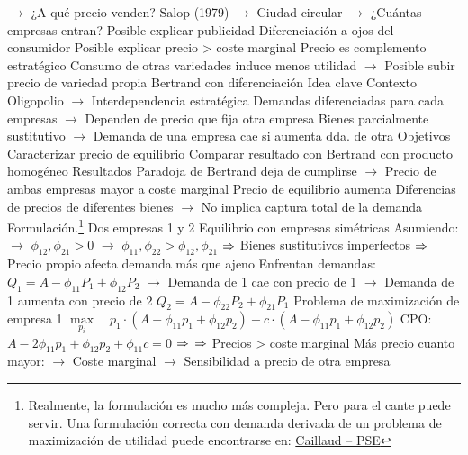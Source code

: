 \documentclass{nuevotema}
\begin{document}
\begin{esquemal}
				\4[] $\to$ ¿A qué precio venden?
				\4[(iii)] Salop (1979)
				\4[] $\to$ Ciudad circular
				\4[] $\to$ ¿Cuántas empresas entran?
				\4 Posible explicar publicidad
				\4[] Diferenciación a ojos del consumidor
				\4 Posible explicar precio > coste marginal
				\4[] Precio es complemento estratégico
				\4[] Consumo de otras variedades induce menos utilidad
				\4[] $\to$ Posible subir precio de variedad propia
		\2 Bertrand con diferenciación
			\3 Idea clave
				\4 Contexto
				\4[] Oligopolio
				\4[] $\to$ Interdependencia estratégica
				\4[] Demandas diferenciadas para cada empresas
				\4[] $\to$ Dependen de precio que fija otra empresa
				\4[] Bienes parcialmente sustitutivo
				\4[] $\to$ Demanda de una empresa cae si aumenta dda. de otra
				\4 Objetivos
				\4[] Caracterizar precio de equilibrio
				\4[] Comparar resultado con Bertrand con producto homogéneo
				\4 Resultados
				\4[] Paradoja de Bertrand deja de cumplirse
				\4[] $\to$ Precio de ambas empresas mayor a coste marginal
				\4[] Precio de equilibrio aumenta
				\4 Diferencias de precios de diferentes bienes
				\4 $\to$ No implica captura total de la demanda
			\3 Formulación.\footnote{Realmente, la formulación es mucho más compleja. Pero para el cante puede servir. Una formulación correcta con demanda derivada de un problema de maximización de utilidad puede encontrarse en: \href{https://www.parisschoolofeconomics.eu/docs/caillaud-bernard/2016-io-2a-differentiation.pdf}{Caillaud -- PSE}}
				\4 Dos empresas 1 y 2
				\4 Equilibrio con empresas simétricas
				\4[] Asumiendo:
				\4[] $\to$ $\phi_{12}, \phi_{21} >0$
				\4[] $\to$ $\phi_{11}, \phi_{22} > \phi_{12}, \phi_{21}$
				\4[] $\Rightarrow$ Bienes sustitutivos imperfectos
				\4[] $\Rightarrow$ Precio propio afecta demanda más que ajeno
				\4[] Enfrentan demandas:
				\4[] $Q_1 = A -\phi_{11} P_1 + \phi_{12} P_2$
				\4[] $\to$ Demanda de 1 cae con precio de 1
				\4[] $\to$ Demanda de 1 aumenta con precio de 2
				\4[] $Q_2 = A -\phi_{22} P_2 + \phi_{21} P_1$
				\4 Problema de maximización de empresa 1
				\4[] $\underset{p_i}{\max} \quad p_1 \cdot (A- \phi_{11} p_1 + \phi_{12} p_2)- c \cdot (A - \phi_{11} p_1 + \phi_{12} p_2)$
				\4[] CPO: $\quad$ $A - 2 \phi_{11}p_1 + \phi_{12} p_2 + \phi_{11} c = 0$
				\4[] $\Rightarrow$ 
				\4[] $\Rightarrow$ 
				\4[] Precios > coste marginal
				\4[] Más precio cuanto mayor:
				\4[] $\to$ Coste marginal
				\4[] $\to$ Sensibilidad a precio de otra empresa

\end{esquemal}
\end{document}
